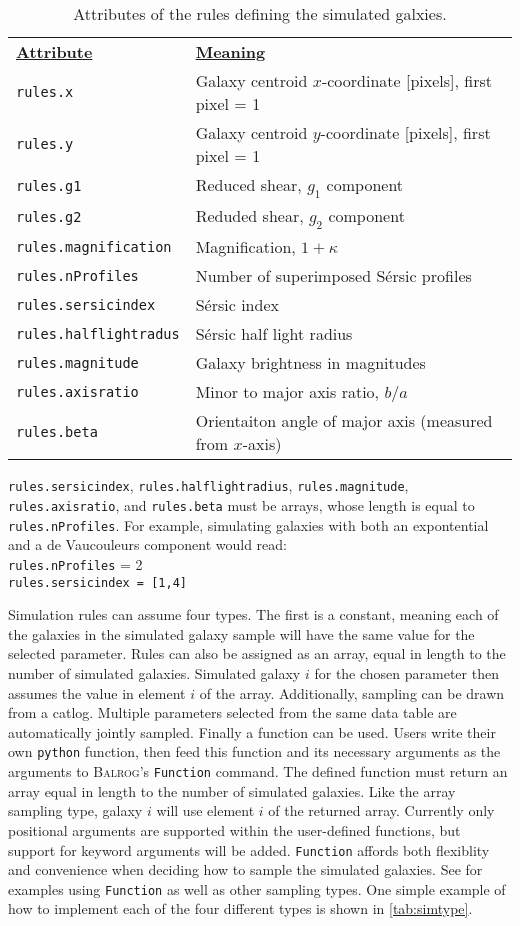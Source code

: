 \documentclass[12pt]{article}
\newcommand{\balrog}{\textsc{Balrog}}
\newcommand{\inset}{\\[0.4cm]}
\newcommand{\sersic}{S\'{e}rsic}
\begin{document}
\vspace{10pt}
\begin{longtabu} to \linewidth {l l}
\caption{Attributes of the rules defining the simulated galxies.} \label{tab:attr}\\
\underline{\textbf{Attribute}} & \underline{\textbf{Meaning}} \\
\texttt{rules.x} & Galaxy centroid $x$-coordinate [pixels], first pixel = 1\\
\texttt{rules.y} & Galaxy centroid $y$-coordinate [pixels], first pixel = 1\\
\texttt{rules.g1} & Reduced shear, $g_1$ component \\
\texttt{rules.g2} & Reduded shear, $g_2$ component \\
\texttt{rules.magnification} & Magnification, $1 + \kappa$ \\
\texttt{rules.nProfiles} & Number of superimposed \sersic{} profiles \\
\texttt{rules.sersicindex} & \sersic{} index \\
\texttt{rules.halflightradus} & \sersic{} half light radius \\
\texttt{rules.magnitude} & Galaxy brightness in magnitudes \\
\texttt{rules.axisratio} & Minor to major axis ratio, $b/a$ \\
\texttt{rules.beta} & Orientaiton angle of major axis (measured from $x$-axis)
\end{longtabu}

\noindent \texttt{rules.sersicindex}, \texttt{rules.halflightradius}, \texttt{rules.magnitude}, \texttt{rules.axisratio},
and \texttt{rules.beta} must be arrays, whose length is equal to \texttt{rules.nProfiles}. For example, simulating
galaxies with both an expontential and a de Vaucouleurs component would read:
\inset
\texttt{rules.nProfiles} = 2 \\
\texttt{rules.sersicindex = [1,4]}

Simulation rules can assume four types. The first is a constant, meaning each of the 
galaxies in the simulated galaxy sample
will have the same value for the selected parameter. 
Rules can also be assigned as an array, equal in length to the number of simulated galaxies. 
Simulated galaxy $i$ for the chosen parameter then assumes the value in element $i$ of
the array.
Additionally, sampling can be drawn from a catlog. Multiple
parameters selected from the same data table are automatically jointly sampled.
Finally a function can be used. Users write their own \texttt{python} function,
then feed this function and its necessary arguments as the arguments to
\balrog{}'s \texttt{Function} command. The defined function must return an
array equal in length to the number of simulated galaxies. Like the array
sampling type, galaxy $i$ will use element $i$ of the returned array.
Currently only positional arguments are supported within the user-defined
functions, but support for keyword arguments will be added.
\texttt{Function} affords both flexiblity and convenience when deciding
how to sample the simulated galaxies. See \config{} for examples
using \texttt{Function} as well as other sampling types.
One simple example of how to implement each of the four different 
types is shown in \autoref{tab:simtype}.
\end{document}
